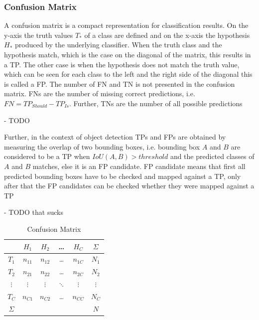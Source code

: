\subsubsection{Confusion Matrix}

A confusion matrix is a compact representation for classification results.
On the y-axis the truth values $T_*$ of a class are defined and on the x-axis the hypothesis $H_*$ produced by the underlying classifier.
When the truth class and the hypothesis match, which is the case on the diagonal of the matrix, this results in a \ac{TP}.
The other case is when the hypothesis does not match the truth value, which can be seen for each class to the left and the right side of the diagonal this is called a \ac{FP}.
The number of \ac{FN} and \ac{TN} is not presented in the confusion matrix.
\acp{FN} are the number of missing correct predictions, i.e. $FN = TP_{Should} - TP_{Is}$.
Further, \acp{TN} are the number of all possible predictions

- TODO

Further, in the context of object detection \acp{TP} and \acp{FP} are obtained by measuring the overlap of two bounding boxes, i.e. bounding box $A$ and $B$ are considered to be a \ac{TP} when $IoU(A, B) > threshold$ and the predicted classes of $A$ and $B$ matches, else it is an \ac{FP} candidate.
\ac{FP} candidate means that first all predicted bounding boxes have to be checked and mapped against a \ac{TP}, only after that the \ac{FP} candidates can be checked whether they were mapped against a \ac{TP}

- TODO that sucks


\begin{table}
\begin{center}
\begin{tabular}{c | c c c c | c}
    & \textbf{$H_1$} & \textbf{$H_2$} & \textbf{\ldots} & \textbf{$H_C$} & {$\Sigma$} \\
    \hline
    $T_1$ & \cellcolor{green}$n_{11}$ & $n_{12}$ & \ldots & $n_{1C}$ & $N_1$\\
    $T_2$ & $n_{21}$ & \cellcolor{green}$n_{22}$ & \ldots & $n_{2C}$ & $N_2$\\
    \textbf{$\vdots$} & $\vdots$ & $\vdots$ & \cellcolor{green}$\ddots$ & $\vdots$ & \textbf{$\vdots$} \\
    $T_C$ & $n_{C1}$ & $n_{C2}$ & \ldots &\cellcolor{green} $n_{CC}$ & $N_C$\\
    \hline
    $\Sigma$  & & & & & $N$\\
\end{tabular}
\caption{Confusion Matrix}
\label{tab:confmat}
\end{center}
\end{table}

